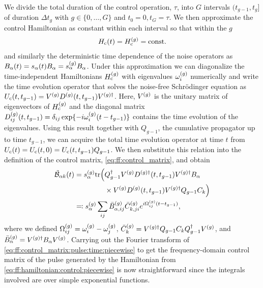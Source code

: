 We divide the total duration of the control operation, $\tau$, into $G$ intervals $(t_{g-1}, t_{g}]$ of duration $\Delta t_g$ with $g\in\lbrace 0,\dotsc,G\rbrace$ and $t_0 =  0, t_G = \tau$.
We then approximate the control Hamiltonian as constant within each interval so that within the $g$
\begin{align}\label{eq:ff:hamiltonian:control:piecewise}
    H_{\mathrm{c}}(t) = H_{\mathrm{c}}^{(g)} = \mathrm{const.}
\end{align}
and similarly the deterministic time dependence of the noise operators as $B_\alpha(t) = s_\alpha(t)B_\alpha = s_\alpha^{(g)}B_\alpha$.
Under this approximation we can diagonalize the time-independent Hamiltonians $H_{\mathrm{c}}^{(g)}$ with eigenvalues $\omega_i^{(g)}$ numerically and write the time evolution operator that solves the noise-free Schrödinger equation as $U_{\mathrm{c}}(t, t_{g-1}) = V^{(g)} D^{(g)}(t, t_{g-1})V^{(g)\dagger}$.
Here, $V^{(g)}$ is the unitary matrix of eigenvectors of $H_{\mathrm{c}}^{(g)}$ and the diagonal matrix $D_{ij}^{(g)}(t, t_{g-1}) = \delta_{ij}\exp\{-i\omega_i^{(g)}(t - t_{g-1})\}$ contains the time evolution of the eigenvalues.
Using this result together with $Q_{g-1}$, the cumulative propagator up to time $t_{g-1}$, we can acquire the total time evolution operator at time $t$ from $U_{\mathrm{c}}(t) = U_{\mathrm{c}}(t,0) = U_{\mathrm{c}}(t, t_{g-1}) Q_{g-1}$.
We then substitute this relation into the definition of the control matrix, \cref{eq:ff:control_matrix}, and obtain
\begin{align}
    \tilde{\mathcal{B}}_{\alpha k}(t) &= \begin{aligned}[t]
                                  s_\alpha^{(g)}\mathrm{tr}\Bigl( & Q_{g-1}^\dagger V^{(g)} D^{(g)\dagger}(t, t_{g-1}) V^{(g)\dagger} B_\alpha \\
                                                               & \times V^{(g)} D^{(g)}(t, t_{g-1})V^{(g)\dagger} Q_{g-1} C_k\Bigr)
                              \end{aligned} \\
                           & \eqqcolon s_\alpha^{(g)}\sum_{ij}\bar{B}_{\alpha,ij}^{(g)}\bar{C}_{k,ji}^{(g)}
                                e^{i\Omega_{ij}^{(g)}(t - t_{g-1})}, \label{eq:ff:control_matrix:pulse:time:piecewise}
\end{align}
where we defined $\Omega_{ij}^{(g)} = \omega_i^{(g)} - \omega_j^{(g)}$, $\bar{C}_{k}^{(g)} = V^{(g)\dagger} Q_{g-1} C_k Q_{g-1}^\dagger V^{(g)}$, and $\bar{B}_{\alpha}^{(g)} = V^{(g)\dagger} B_\alpha V^{(g)}$.
Carrying out the Fourier transform of \cref{eq:ff:control_matrix:pulse:time:piecewise} to get the frequency-domain control matrix of the pulse generated by the Hamiltonian from \cref{eq:ff:hamiltonian:control:piecewise} is now straightforward since the integrals involved are over simple exponential functions.
